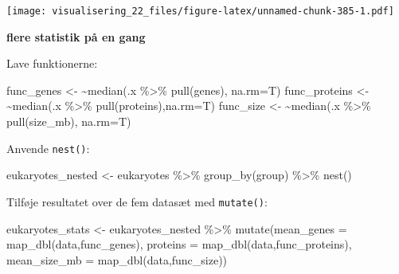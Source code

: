\documentclass[
]{book}
\newenvironment{Shaded}{\begin{snugshade}}{\end{snugshade}}
\newcommand{\AttributeTok}[1]{\textcolor[rgb]{0.77,0.63,0.00}{#1}}
\newcommand{\ErrorTok}[1]{\textcolor[rgb]{0.64,0.00,0.00}{\textbf{#1}}}
\newcommand{\FunctionTok}[1]{\textcolor[rgb]{0.00,0.00,0.00}{#1}}
\newcommand{\NormalTok}[1]{#1}
\newcommand{\OtherTok}[1]{\textcolor[rgb]{0.56,0.35,0.01}{#1}}
\newcommand{\SpecialCharTok}[1]{\textcolor[rgb]{0.00,0.00,0.00}{#1}}
\begin{document}
\texttt{[image: visualisering\_22\_files/figure-latex/unnamed-chunk-385-1.pdf]}

\textbf{flere statistik på en gang}

Lave funktionerne:

\begin{Shaded}
\begin{Highlighting}[]
\NormalTok{func\_genes }\OtherTok{\textless{}{-}}       \ErrorTok{\textasciitilde{}}\FunctionTok{median}\NormalTok{(.x }\SpecialCharTok{\%\textgreater{}\%} \FunctionTok{pull}\NormalTok{(genes),   }\AttributeTok{na.rm=}\NormalTok{T) }
\NormalTok{func\_proteins }\OtherTok{\textless{}{-}}    \ErrorTok{\textasciitilde{}}\FunctionTok{median}\NormalTok{(.x }\SpecialCharTok{\%\textgreater{}\%} \FunctionTok{pull}\NormalTok{(proteins),}\AttributeTok{na.rm=}\NormalTok{T) }
\NormalTok{func\_size }\OtherTok{\textless{}{-}}        \ErrorTok{\textasciitilde{}}\FunctionTok{median}\NormalTok{(.x }\SpecialCharTok{\%\textgreater{}\%} \FunctionTok{pull}\NormalTok{(size\_mb), }\AttributeTok{na.rm=}\NormalTok{T) }
\end{Highlighting}
\end{Shaded}

Anvende \texttt{nest()}:

\begin{Shaded}
\begin{Highlighting}[]
\NormalTok{eukaryotes\_nested }\OtherTok{\textless{}{-}}\NormalTok{ eukaryotes }\SpecialCharTok{\%\textgreater{}\%} 
  \FunctionTok{group\_by}\NormalTok{(group) }\SpecialCharTok{\%\textgreater{}\%} 
  \FunctionTok{nest}\NormalTok{() }
\end{Highlighting}
\end{Shaded}

Tilføje resultatet over de fem datasæt med \texttt{mutate()}:

\begin{Shaded}
\begin{Highlighting}[]
\NormalTok{eukaryotes\_stats }\OtherTok{\textless{}{-}}\NormalTok{ eukaryotes\_nested }\SpecialCharTok{\%\textgreater{}\%}
  \FunctionTok{mutate}\NormalTok{(}\AttributeTok{mean\_genes =} \FunctionTok{map\_dbl}\NormalTok{(data,func\_genes),}
         \AttributeTok{proteins =} \FunctionTok{map\_dbl}\NormalTok{(data,func\_proteins),}
         \AttributeTok{mean\_size\_mb =} \FunctionTok{map\_dbl}\NormalTok{(data,func\_size))}
\end{Highlighting}
\end{Shaded}
\end{document}
